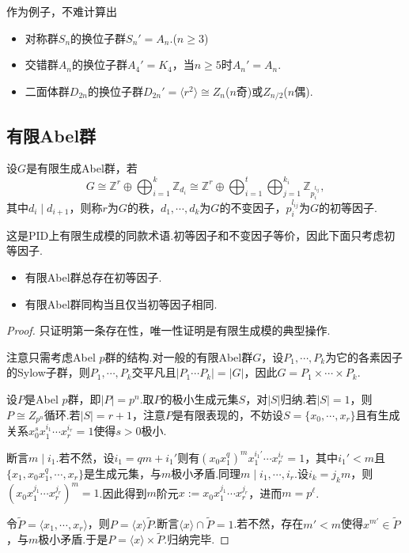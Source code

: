 作为例子，不难计算出
\begin{itemize}
	\item 对称群$S_n$的换位子群$S_n'=A_n$.($n\ge 3$)
	\item 交错群$A_n$的换位子群$A_4'=K_4$，当$n\ge 5$时$A_n'=A_n$.
	\item 二面体群$D_{2n}$的换位子群$D_{2n}'=\langle r^2\rangle\cong Z_n$($n$奇)或$Z_{n/2}$($n$偶).
\end{itemize}

\subsection{有限Abel群}
\begin{definition}
	设$G$是有限生成Abel群，若
	\[
		G\cong\mathbb{Z}^r\oplus\bigoplus_{i=1}^k\mathbb{Z}_{d_i}\cong\mathbb{Z}^r\oplus\bigoplus_{i=1}^t\bigoplus_{j=1}^{k_i}\mathbb{Z}_{p_i^{l_{ij}}},
	\]
	其中$d_i\mid d_{i+1}$，则称$r$为$G$的{\heiti 秩}，$d_1,\cdots,d_k$为$G$的{\heiti 不变因子}，$p_i^{l_{ij}}$为$G$的{\heiti 初等因子}.
\end{definition}
\begin{remark}
	这是PID上有限生成模的同款术语.初等因子和不变因子等价，因此下面只考虑初等因子.
\end{remark}
\begin{thm}[(有限Abel群结构)]
	\begin{itemize}
		\item 有限Abel群总存在初等因子.
		\item 有限Abel群同构当且仅当初等因子相同.
	\end{itemize}\hypertarget{thm:FiniteAbelStruc}{}
\end{thm}
\begin{proof}
	只证明第一条存在性，唯一性证明是有限生成模的典型操作.
	
	注意只需考虑Abel $p$群的结构.对一般的有限Abel群$G$，设$P_1,\cdots,P_k$为它的各素因子的Sylow子群，则$P_1,\cdots,P_k$交平凡且$|P_1\cdots P_k|=|G|$，因此$G=P_1\times\cdots\times P_k$.

	设$P$是Abel $p$群，即$|P|=p^n$.取$P$的极小生成元集$S$，对$|S|$归纳.若$|S|=1$，则$P\cong Z_{p^n}$循环.若$|S|=r+1$，注意$P$是有限表现的，不妨设$S=\{x_0,\cdots,x_r\}$且有生成关系$x_0^sx_1^{i_1}\cdots x_r^{i_r}=1$使得$s>0$极小.

	断言$m\mid i_1$.若不然，设$i_1=qm+i_1'$则有$(x_0x_1^q)^mx_1^{i_1'}\cdots x_r^{i_r}=1$，其中$i_1'<m$且$\{x_1,x_0x_1^q,\cdots,x_r\}$是生成元集，与$m$极小矛盾.同理$m\mid i_1,\cdots,i_r$.设$i_k=j_km$，则$(x_0x_1^{j_1}\cdots x_r^{j_r})^m=1$.因此得到$m$阶元$x:=x_0x_1^{j_1}\cdots x_r^{j_r}$，进而$m=p^\ell$.

	令$\tilde P=\langle x_1,\cdots,x_r\rangle $，则$P=\langle x\rangle \tilde P$.断言$\langle x\rangle \cap\tilde{P}=1$.若不然，存在$m'<m$使得$x^{m'}\in\tilde{P}$，与$m$极小矛盾.于是$P=\langle x\rangle \times\tilde{P}$.归纳完毕.
\end{proof}

